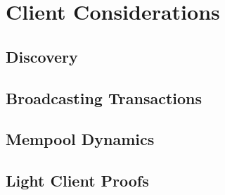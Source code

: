 \chapter{Client Considerations}

\section{Discovery}

\section{Broadcasting Transactions}

\section{Mempool Dynamics}

\section{Light Client Proofs}
